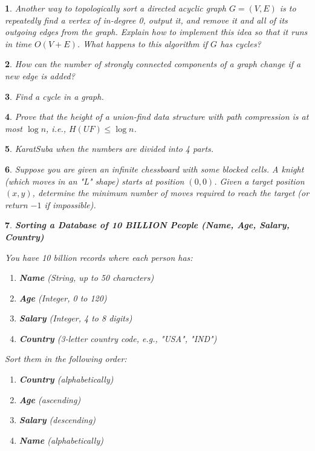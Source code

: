 \documentclass[%
addpoints]{exam}
\theoremstyle{problem}
\newtheorem{p}{}
\begin{document}
\begin{p} 
Another way to topologically sort a directed acyclic graph \( G = (V, E) \) is to repeatedly find a vertex of in-degree 0, output it, and remove it and all of its outgoing edges from the graph. Explain how to implement this idea so that it runs in time \( O(V + E) \). What happens to this algorithm if \( G \) has cycles?  
\hfill  
\end{p}

\begin{p} 
How can the number of strongly connected components of a graph change if a new edge is added?  
\hfill  
\end{p}

\begin{p}
Find a cycle in a graph.  
\hfill
\end{p}

\begin{p}
Prove that the height of a union-find data structure with path compression is at most $\log n$, i.e., $H(UF) \leq \log n$.  
\hfill
\end{p}

\begin{p}
KaratSuba when the numbers are divided into 4 parts.
\hfill\end{p}

\begin{p}
Suppose you are given an infinite chessboard with some blocked cells. A knight (which moves in an "L" shape) starts at position $(0,0)$. Given a target position $(x, y)$, determine the minimum number of moves required to reach the target (or return $-1$ if impossible).
\hfill\end{p}

\begin{p}
\textbf{Sorting a Database of 10 BILLION People (Name, Age, Salary, Country)}

You have 10 billion records where each person has:

\begin{enumerate}
    \item \textbf{Name} (String, up to 50 characters)
    \item \textbf{Age} (Integer, 0 to 120)
    \item \textbf{Salary} (Integer, 4 to 8 digits)
    \item \textbf{Country} (3-letter country code, e.g., "USA", "IND")
\end{enumerate}

Sort them in the following order:

\begin{enumerate}
    \item[\textcircled{1}] \textbf{Country} (alphabetically)
    \item[\textcircled{2}] \textbf{Age} (ascending)
    \item[\textcircled{3}] \textbf{Salary} (descending)
    \item[\textcircled{4}] \textbf{Name} (alphabetically)
\end{enumerate}
\hfill\end{p}
\end{document}
